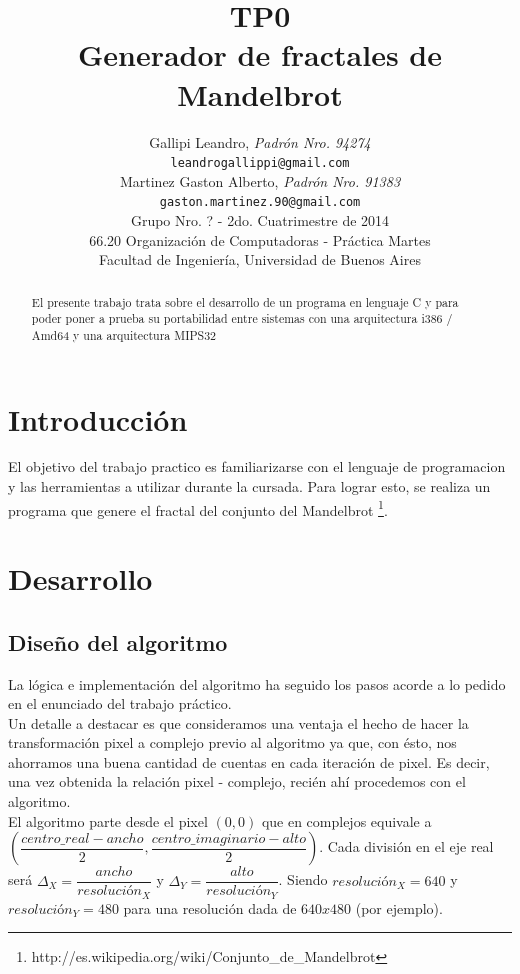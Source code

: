 \documentclass[10pt,spanish,a4paper,openany,notitlepage]{article}
\title{\textbf{TP0}\\ Generador de fractales de Mandelbrot}
\author{Gallipi Leandro, \textit{Padrón Nro. 94274}                    \\
            \texttt{  leandrogallippi@gmail.com }                                              			\\
            Martinez Gaston Alberto, \textit{Padrón Nro. 91383}                     	\\
            \texttt{gaston.martinez.90@gmail.com}                                          			\\[2.5ex]
            \normalsize{Grupo Nro. ? - 2do. Cuatrimestre de 2014}                       	\\
            \normalsize{66.20 Organización de Computadoras - Práctica Martes}  	\\
            \normalsize{Facultad de Ingeniería, Universidad de Buenos Aires}     	\\
       }
\date{}
\begin{document}
\setcounter{page}{0} %

\maketitle

\thispagestyle{empty}

\begin{abstract}
El presente trabajo trata sobre el desarrollo de un programa en lenguaje C y para poder poner a prueba su portabilidad entre sistemas con una arquitectura i386 / Amd64 y una arquitectura MIPS32
\end{abstract}
 
\newpage

\section{Introducción}

El objetivo del trabajo practico es familiarizarse con el lenguaje de programacion y las herramientas a utilizar durante la cursada. Para lograr esto, se realiza un programa que genere el fractal del conjunto del Mandelbrot \footnote{http://es.wikipedia.org/wiki/Conjunto\_de\_Mandelbrot}.\\


\section{Desarrollo}

\subsection{Diseño del algoritmo}

La lógica e implementación del algoritmo ha seguido los pasos acorde a lo pedido en el enunciado del trabajo práctico. \\
Un detalle a destacar es que consideramos una ventaja el hecho de hacer la transformación pixel a complejo previo al algoritmo ya que, con ésto, nos ahorramos una buena cantidad de cuentas en cada iteración de pixel. Es decir, una vez obtenida la relación pixel - complejo, recién ahí procedemos con el algoritmo.\\
El algoritmo parte desde el pixel $(0,0)$ que en complejos equivale a $(\dfrac{centro\_real - ancho}{2},\dfrac{centro\_imaginario - alto}{2})$. Cada división en el eje real será $\Delta_X = \dfrac{ancho}{resolución_X}$
y $\Delta_Y = \dfrac{alto}{resolución_Y}$. Siendo $resolución_X = 640$ y $resolución_Y = 480$ para una resolución dada de $640x480$ (por ejemplo).
\end{document}
